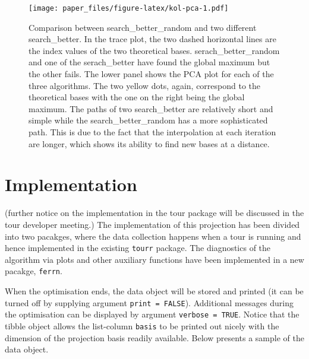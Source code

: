 \documentclass[12pt]{article}
\begin{document}
\begin{figure}
\centering
\texttt{[image: paper\_files/figure-latex/kol-pca-1.pdf]}
\caption{\label{fig:kol-pca}\label{kol-pca}Comparison between search\_better\_random and two different search\_better. In the trace plot, the two dashed horizontal lines are the index values of the two theoretical bases. serach\_better\_random and one of the serach\_better have found the global maximum but the other fails. The lower panel shows the PCA plot for each of the three algorithms. The two yellow dots, again, correspond to the theoretical bases with the one on the right being the global maximum. The paths of two search\_better are relatively short and simple while the search\_better\_random has a more sophisticated path. This is due to the fact that the interpolation at each iteration are longer, which shows its ability to find new bases at a distance.}
\end{figure}

\hypertarget{implementation}{%
\section{Implementation}\label{implementation}}

(further notice on the implementation in the tour package will be discussed in the tour developer meeting.)
The implementation of this projection has been divided into two pacakges, where the data collection happens when a tour is running and hence implemented in the existing \texttt{tourr} package. The diagnostics of the algorithm via plots and other auxiliary functions have been implemented in a new pacakge, \texttt{ferrn}.

When the optimisation ends, the data object will be stored and printed (it can be turned off by supplying argument \texttt{print\ =\ FALSE}). Additional messages during the optimisation can be displayed by argument \texttt{verbose\ =\ TRUE}. Notice that the tibble object allows the list-column \texttt{basis} to be printed out nicely with the dimension of the projection basis readily available. Below presents a sample of the data object.
\end{document}
